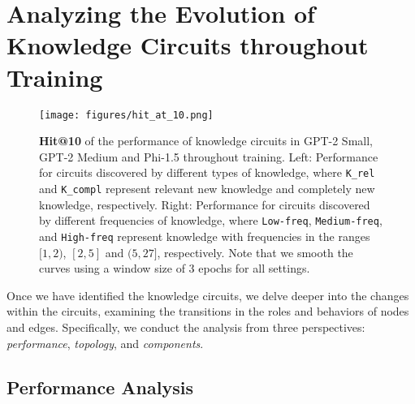 \section{Analyzing the Evolution of Knowledge Circuits throughout Training}

\begin{figure*}[htp]
    \centering
    \texttt{[image: figures/hit\_at\_10.png]}
    \caption{\textbf{Hit@10} of the performance of knowledge circuits in GPT-2 Small, GPT-2 Medium and Phi-1.5 throughout training. Left: Performance for circuits discovered by different types of knowledge, where \textcolor[RGB]{148,103,189}{\texttt{K\_rel}} and \textcolor[RGB]{227,119,194}{\texttt{K\_compl}} represent \textcolor[RGB]{148,103,189}{relevant new knowledge} and \textcolor[RGB]{227,119,194}{completely new knowledge}, respectively. Right: Performance for circuits discovered by different frequencies of knowledge, where \textcolor[RGB]{44,160,44}{\texttt{Low-freq}}, \textcolor[RGB]{255,127,14}{\texttt{Medium-freq}}, and \textcolor[RGB]{31,119,180}{\texttt{High-freq}} represent knowledge with frequencies in the ranges  \textcolor[RGB]{44,160,44}{$[1, 2)$}, \textcolor[RGB]{255,127,14}{$[2,5]$} and \textcolor[RGB]{31,119,180}{$(5, 27]$}, respectively. Note that we smooth the curves using a window size of 3 epochs for all settings.}
    \label{fig:hit_at_10}
    \vspace{-10pt}
\end{figure*}

Once we have identified the knowledge circuits, we delve deeper into the changes within the circuits, examining the transitions in the roles and behaviors of nodes and edges.
Specifically, we conduct the analysis from three perspectives: \textit{performance}, \textit{topology}, and \textit{components}.

\subsection{Performance Analysis}
\label{sec:performance}

